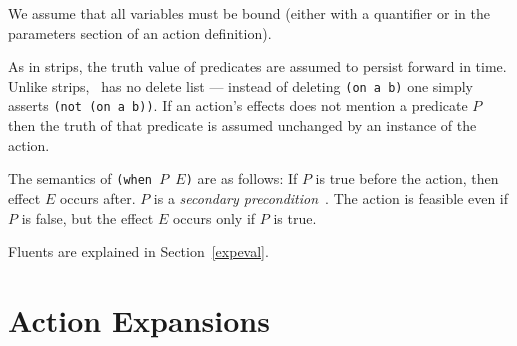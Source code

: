 We assume that all variables must be bound (either with a quantifier or in
the parameters section of an action definition). 

As in {\sc strips}, the truth value of predicates are assumed to persist
forward in time.  Unlike {\sc strips}, \lang\ has no delete list ---
instead of deleting {\tt (on a b)} one simply asserts {\tt (not (on a
b))}. If an action's effects does not mention a predicate $P$ then the
truth of that predicate is assumed unchanged by an instance of the
action. 

The semantics of {\tt (when $P$ $E$)} are as follows: If $P$ is true
before the action, then effect $E$ occurs after.  $P$ is a {\em
secondary precondition}~\cite{pednault-kr89}.  The action is feasible
even if $P$ is false, but the effect $E$ occurs only if $P$ is true.

Fluents are explained in Section~\ref{expeval}.

\section{Action Expansions}
\label{expansions}

